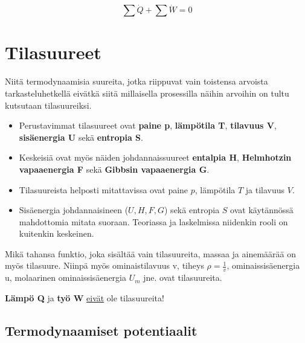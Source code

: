 \documentclass[12pt,a4paper,finnish]{book}
\begin{document}
\begin{equation}
 \sum\dot{Q} + \sum\dot{W} = 0
\end{equation}

\chapter{Tilasuureet} \label{chapter:tilasuureet} %

Niitä termodynaamisia suureita, jotka riippuvat vain toistensa arvoista tarkasteluhetkellä 
eivätkä siitä millaisella prosessilla näihin arvoihin on tultu kutsutaan tilasuureiksi.

\begin{itemize}
 \item Perustavimmat tilasuureet ovat \textbf{paine p}, \textbf{lämpötila T}, 
    \textbf{tilavuus V}, \textbf{sisäenergia U} sekä \textbf{entropia S}.
 \item Keskeisiä ovat myös näiden johdannaissuureet \textbf{entalpia H}, 
  \textbf{Helmhotzin vapaaenergia F} sekä \textbf{Gibbsin vapaaenergia G}.
\end{itemize}

\begin{itemize}
 \item Tilasuureista helposti mitattavissa ovat paine $p$, lämpötila $T$ ja tilavuus $V$.
 \item Sisäenergia johdannaisineen ($U, H, F, G$) sekä entropia $S$ ovat käytännössä 
  mahdottomia mitata suoraan. Teoriassa ja laskelmissa niidenkin rooli on kuitenkin keskeinen.
\end{itemize}

Mikä tahansa funktio, joka sisältää vain tilasuureita, massaa ja ainemäärää on myös tilasuure. 
Niinpä myös ominaistilavuus v, tiheys $\rho = \frac{1}{v}$, ominaissisäenergia u, molaarinen 
ominaissisäenergia $U_m$ jne. ovat tilasuureita.


\textbf{Lämpö Q} ja \textbf{työ W} \underline{eivät} ole tilasuureita!


\section{Termodynaamiset potentiaalit} %

\end{document}
